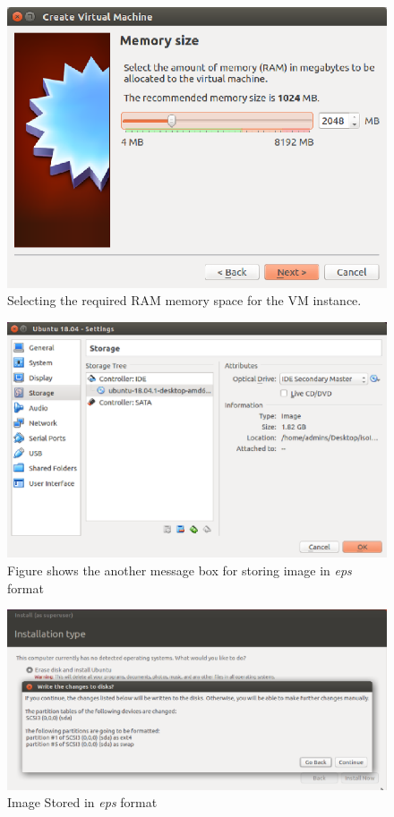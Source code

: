 \documentclass[a4paper,10pt]{article}
\begin{document}
\begin{figure}[h]
	\includegraphics[scale=0.25]{fig3.png}
	\caption{Selecting the required RAM memory space for the VM instance.}
	\label{fig:3}
\end{figure}

\begin{figure}[h]
	\includegraphics[scale=0.25]{fig4.png}
	\caption{Figure shows the another message box for storing image in \textit{eps} format}
	\label{fig:4}
\end{figure}

\begin{figure}[h]
	\includegraphics[scale=0.25]{fig5.png}
	\caption{Image Stored in \textit{eps} format}
	\label{fig:5}
\end{figure}
\end{document}
